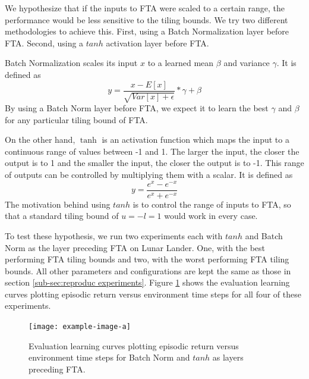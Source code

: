 \documentclass{article}
\begin{document}
We hypothesize that if the inputs to FTA were scaled to a certain range, the performance would be less sensitive to the tiling bounds. 
We try two different methodologies to achieve this. 
First, using a Batch Normalization \cite[]{ioffe2015batch} layer before FTA. 
Second, using a $tanh$ activation layer before FTA. 

Batch Normalization scales its input $x$ to a learned mean $\beta$ and variance $\gamma$. 
It is defined as 
\begin{equation}
    y = \frac{x-E[x]}{\sqrt{Var[x] + \epsilon}} * \gamma + \beta
    \label{eq:batchnorm}
\end{equation}
By using a Batch Norm layer before FTA, we expect it to learn the best $\gamma$ and $\beta$ for any particular tiling bound of FTA.

On the other hand, $\tanh$ is an activation function which maps the input to a continuous range of values between -1 and 1. 
The larger the input, the closer the output is to 1 and the smaller the input, the closer the output is to -1. 
This range of outputs can be controlled by multiplying them with a scalar. 
It is defined as 
 \begin{equation}
    y = \frac{e^x-e^{-x}}{e^x+e^{-x}}
    \label{eq:tanh}
 \end{equation}
The motivation behind using $tanh$ is to control the range of inputs to FTA, so that a standard tiling bound of $u = -l = 1$ would work in every case.

To test these hypothesis, we run two experiments each with $tanh$ and Batch Norm as the layer preceding FTA on Lunar Lander. 
One, with the best performing FTA tiling bounds and two, with the worst performing FTA tiling bounds. 
All other parameters and configurations are kept the same as those in section \ref{sub-sec:reproduc experiments}. 
Figure \ref{fig:bnvtanh} shows the evaluation learning curves plotting episodic return versus environment time steps for all four of these experiments.

\begin{figure}[h]
    \centering
    \texttt{[image: example-image-a]}
    \caption{Evaluation learning curves plotting episodic return versus environment time steps for Batch Norm and $tanh$ as layers preceding FTA.}
    \label{fig:bnvtanh}
\end{figure}
\end{document}
